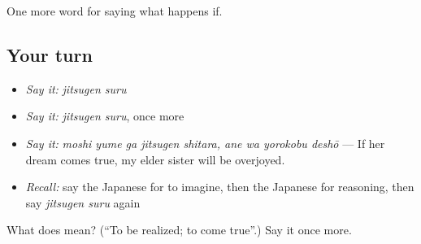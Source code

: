 \begin{grammarlens}[title={What you've built}]
One more word for saying what happens if.
\end{grammarlens}

\subsection*{Your turn}
\begin{itemize}
\raggedright
  \item \emph{Say it:} \emph{jitsugen suru}
  \item \emph{Say it:} \emph{jitsugen suru}, once more
  \item \emph{Say it:} \emph{moshi yume ga jitsugen shitara, ane wa yorokobu deshō} — If her dream comes true, my elder sister will be overjoyed.
  \item \emph{Recall:} say the Japanese for to imagine, then the Japanese for reasoning, then say \emph{jitsugen suru} again
\end{itemize}

\begin{tcolorbox}[breakable,colback=teal!4,colframe=teal!35!black,title={Before you move on}]
What does  mean? (\textquotedblleft{}To be realized; to come true\textquotedblright{}.) Say it once more.
\end{tcolorbox}
